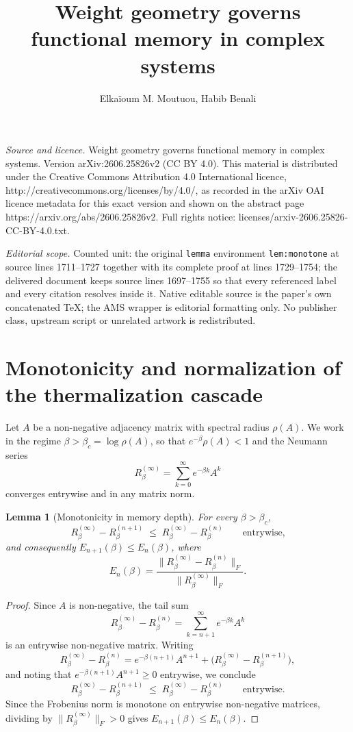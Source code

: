 \documentclass[10pt,a4paper]{amsart}
\newtheorem{lemma}[theorem]{Lemma}
\begin{document}
\title[Weight geometry governs functional memory in complex systems]{Weight geometry governs functional memory in complex systems}
\author{Elkaïoum M. Moutuou, Habib Benali}
\date{}
\maketitle
\noindent\emph{Source and licence.} Weight geometry governs functional memory in complex systems. Version arXiv:2606.25826v2 (CC BY 4.0). This material is distributed under the Creative Commons Attribution 4.0 International licence, http://creativecommons.org/licenses/by/4.0/, as recorded in the arXiv OAI licence metadata for this exact version and shown on the abstract page https://arxiv.org/abs/2606.25826v2. Full rights notice: licenses/arxiv-2606.25826-CC-BY-4.0.txt.\par\smallskip
\noindent\textit{Editorial scope.} Counted unit: the original \texttt{lemma} environment \texttt{lem:monotone} at source lines 1711--1727 together with its complete proof at lines 1729--1754; the delivered document keeps source lines 1697--1755 so that every referenced label and every citation resolves inside it. Native editable source is the paper's own concatenated TeX; the AMS wrapper is editorial formatting only. No publisher class, upstream script or unrelated artwork is redistributed.
\section{Monotonicity and normalization of the thermalization cascade}
\label{sec:monotonicity}

Let $A$ be a non-negative adjacency matrix with spectral radius $\rho(A)$.
We work in the regime $\beta>\beta_c=\log\rho(A)$, so that
$e^{-\beta}\rho(A)<1$ and the Neumann series
\[
  R_\beta^{(\infty)}
  =
  \sum_{k=0}^{\infty}e^{-\beta k}A^k
\]
converges entrywise and in any matrix norm.


\begin{lemma}[Monotonicity in memory depth]
\label{lem:monotone}
For every $\beta>\beta_c$,
\[
  R_\beta^{(\infty)}-R_\beta^{(n+1)}
  \;\leq\;
  R_\beta^{(\infty)}-R_\beta^{(n)}
  \qquad\text{entrywise,}
\]
and consequently $E_{n+1}(\beta)\leq E_n(\beta)$, where
\[
  E_n(\beta)
  =
  \frac{\|R_\beta^{(\infty)}-R_\beta^{(n)}\|_F}
       {\|R_\beta^{(\infty)}\|_F}.
\]
\end{lemma}

\begin{proof}
Since $A$ is non-negative, the tail sum
\[
  R_\beta^{(\infty)}-R_\beta^{(n)}
  =
  \sum_{k=n+1}^{\infty}e^{-\beta k}A^k
\]
is an entrywise non-negative matrix. Writing
\[
  R_\beta^{(\infty)}-R_\beta^{(n)}
  =
  e^{-\beta(n+1)}A^{n+1}
  +
  \bigl(R_\beta^{(\infty)}-R_\beta^{(n+1)}\bigr),
\]
and noting that $e^{-\beta(n+1)}A^{n+1}\geq 0$ entrywise, we conclude
\[
  R_\beta^{(\infty)}-R_\beta^{(n+1)}
  \;\leq\;
  R_\beta^{(\infty)}-R_\beta^{(n)}
  \qquad\text{entrywise.}
\]
Since the Frobenius norm is monotone on entrywise non-negative matrices,
dividing by $\|R_\beta^{(\infty)}\|_F>0$ gives $E_{n+1}(\beta)\leq
E_n(\beta)$.
\end{proof}
\end{document}
